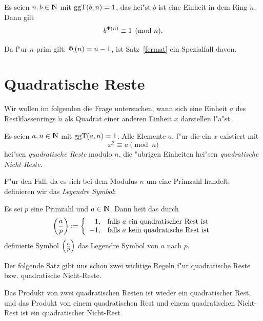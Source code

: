 \begin{satz} 
Es seien $n,b\in\N$ mit $\mbox{ggT}(b,n)=1$, das hei"st $b$ ist eine Einheit
in dem Ring $\ring{n}$. Dann gilt
$$ b^{\Phi\left( n \right)} \equiv 1 \pmod{n} .$$
\end{satz}

Da f"ur $n$ prim gilt: $\Phi\left( n \right) = n-1$, ist Satz~\ref{fermat} ein
Spezialfall davon.

\section{Quadratische Reste}

Wir wollen im folgenden die Frage untersuchen, wann sich eine Einheit $a$
des Restklassenrings $\ring{n}$ als Quadrat einer anderen Einheit $x$
darstellen l"a"st.

\begin{definition}
  Es seien $a,n \in \N$ mit $\mbox{ggT}(a,n)=1$. Alle Elemente $a$, f"ur die
  ein $x$ existiert mit
  $$ x^2 \equiv a \pmod{n} $$ hei"sen {\em quadratische Reste} modulo
  $n$, die "ubrigen Einheiten hei"sen {\em quadratische Nicht-Reste}.
\end{definition}

F"ur den Fall, da\3 es sich bei dem Modulus $n$ um eine Primzahl
handelt, definieren wir das {\em Legendre Symbol}:

\begin{definition}
Es sei $p$ eine Primzahl und $a\in\N$. Dann hei\3t das durch 
\begin{equation}
  \left(\frac{a}{p}\right) := \left\{ 
                  \begin{array}{rl}
                        1, & \mbox{falls $a$ ein quadratischer Rest ist} \\
                       -1, & \mbox{falls $a$ kein quadratische Rest ist}
                  \end{array}
                \right.
\end{equation}
definierte Symbol $\left(\frac{a}{p}\right)$ das Legendre Symbol von $a$ nach $p$.
\end{definition}

Der folgende Satz gibt uns schon zwei wichtige Regeln f"ur
quadratische Reste bzw. quadratische Nicht-Reste.

\begin{satz} \label{wannQR}
Das Produkt von zwei quadratischen Resten ist wieder ein quadratischer
Rest, und das Produkt von einem quadratischen Rest und einem
quadratischen Nicht-Rest ist ein quadratischer Nicht-Rest.
\end{satz}

